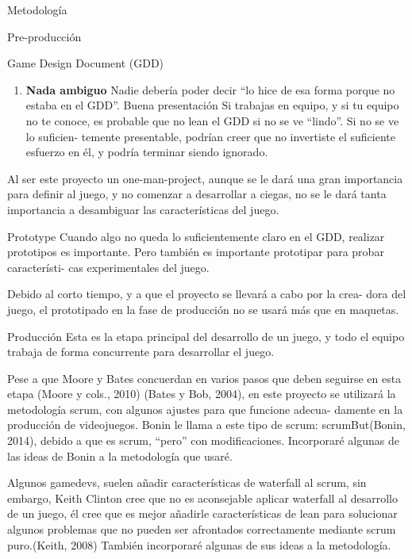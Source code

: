 \begin{section}{Metodología}
\begin{subsection}{Pre-producción}
\begin{subsubsection}{Game Design Document (GDD)}
\begin{enumerate}
      \item \textbf{Nada ambiguo} Nadie debería poder decir ``lo hice de esa forma porque no estaba en el GDD''. Buena presentación Si trabajas en equipo, y si tu equipo no te conoce, es probable que no lean el GDD si no se ve ``lindo''. Si no se ve lo suficien- temente presentable, podrían creer que no invertiste el suficiente esfuerzo en él, y podría terminar siendo ignorado.
      \end{enumerate}

      Al ser este proyecto un one-man-project, aunque se le dará una gran importancia para definir al juego, y no comenzar a desarrollar a ciegas, no se le dará tanta importancia a desambiguar las características del juego.
    \end{subsubsection}

    \begin{subsubsection}{Prototype}
      Cuando algo no queda lo suficientemente claro en el GDD, realizar prototipos es importante. Pero también es importante prototipar para probar característi- cas experimentales del juego.

      Debido al corto tiempo, y a que el proyecto se llevará a cabo por la crea- dora del juego, el prototipado en la fase de producción no se usará más que en maquetas.
    \end{subsubsection}

  \end{subsection}

  \begin{subsection}{Producción}
    Esta es la etapa principal del desarrollo de un juego, y todo el equipo trabaja de forma concurrente para desarrollar el juego.

    Pese a que Moore y Bates concuerdan en varios pasos que deben seguirse en esta etapa (Moore y cols., 2010) (Bates y Bob, 2004), en este proyecto se utilizará la metodología scrum, con algunos ajustes para que funcione adecua- damente en la producción de videojuegos. Bonin le llama a este tipo de scrum: scrumBut(Bonin, 2014), debido a que es scrum, ``pero'' con modificaciones. Incorporaré algunas de las ideas de Bonin a la metodología que usaré.

    Algunos gamedevs, suelen añadir características de waterfall al scrum, sin embargo, Keith Clinton cree que no es aconsejable aplicar waterfall al desarrollo de un juego, él cree que es mejor añadirle características de lean para solucionar algunos problemas que no pueden ser afrontados correctamente mediante scrum puro.(Keith, 2008) También incorporaré algunas de sus ideas a la metodología.


\end{subsection}
\end{section}
